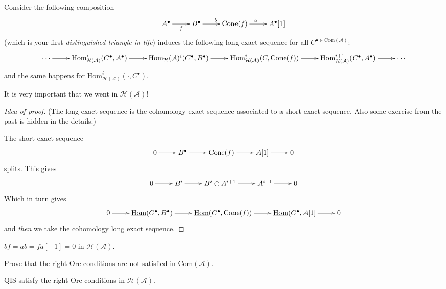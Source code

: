 \begin{lemma}
\label{lemma-cone-long-exact-sequence}
Consider the following composition
$$
\xymatrix{
A^\bullet\ar[r]_f&  B^{\bullet}\ar[r]^b&  \text{Cone}(f)\ar[r]^a &
A^{\bullet}[1]
}
$$
(which is your first {\it distinguished triangle in life}) induces the following
long exact sequence for all $C^{\bullet \in \text{Com}(\mathcal{A})}$:
$$
\xymatrix{
\cdots\ar[r]&\text{Hom}^i_{\mathcal{H}(\mathcal{A})}(C^{\bullet},A^{\bullet})\ar[r]&\text{Hom}_{\mathcal{H}}(\mathcal{A})^i(C^{\bullet},B^{\bullet})\ar[r]&\text{Hom}^i_{\mathcal{H}(\mathcal{A})}(C,\text{Cone}(f))\ar[r]&\text{Hom}^{i+1}_{\mathcal{H}(\mathcal{A})}(C^{\bullet},A^{\bullet})\ar[r]&\cdots
}
$$
and the same happens for
$\text{Hom}^i_{\mathcal{H}(\mathcal{A})}(\cdot,C^{\bullet})$.
\end{lemma}

It is very important that we went in $\mathcal{H}(\mathcal{A})$!

\begin{proof}[Idea of proof]
(The long exact sequence is the cohomology exact sequence associated
to a short exact sequence. Also some exercise from the past is hidden in the
details.)

The short exact sequence
$$
\xymatrix{
0\ar[r]&B^{\bullet}\ar[r]&\text{Cone}(f)\ar[r]&A[1]\ar[r]&0
}
$$
splits. This gives
$$
\xymatrix{
0\ar[r]&B^i\ar[r]&B^i\oplus A^{i+1}\ar[r]&A^{i+1}\ar[r]&0
}
$$
Which in turn gives
$$
\xymatrix{
0\ar[r]&\underline{\text{Hom}}(C^{\bullet},B^{\bullet})
\ar[r]&\underline{\text{Hom}}(C^{\bullet},\text{Cone}(f))
\ar[r]&\underline{\text{Hom}}(C^{\bullet},A[1]\ar[r]&0
}
$$
and {\it then} we take the cohomology long exact sequence.
\end{proof}

\begin{exercise}
\label{exercise-simple}
$bf=ab=fa[-1]=0$ in $\mathcal{H}(\mathcal{A})$.
\end{exercise}

\begin{exercise}
\label{exercise-right-Ore-conditions-not-in-Com}
Prove that the right Ore conditions are not satisfied in
$\text{Com}(\mathcal{A})$.
\end{exercise}

\begin{proposition}
\label{proposition-QIS-satisfy-right-Ore-conditions-in-homotopy-category}
QIS satisfy the right Ore conditions in $\mathcal{H}(\mathcal{A})$.
\end{proposition}

